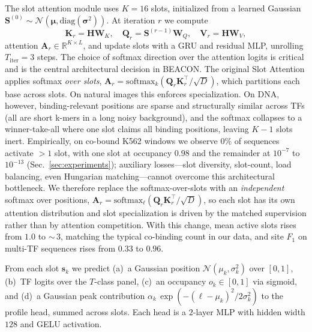 \documentclass{article}
\begin{document}
The slot attention module uses $K{=}16$ slots, initialized from a learned Gaussian $\mathbf{S}^{(0)}\!\sim\!\mathcal{N}(\boldsymbol{\mu},\mathrm{diag}(\boldsymbol{\sigma}^2))$. At iteration $r$ we compute
\begin{equation}
\mathbf{K}_r{=}\mathbf{H}\mathbf{W}_K,\quad \mathbf{Q}_r{=}\mathbf{S}^{(r-1)}\mathbf{W}_Q,\quad \mathbf{V}_r{=}\mathbf{H}\mathbf{W}_V,
\end{equation}
attention $\mathbf{A}_r\!\in\!\mathbb{R}^{K\times L}$, and update slots with a GRU and residual MLP, unrolling $T_{\text{iter}}{=}3$ steps. The choice of softmax direction over the attention logits is critical and is the central architectural decision in BEACON. The original Slot Attention applies softmax \emph{over slots}, $\mathbf{A}_r=\mathrm{softmax}_{k}(\mathbf{Q}_r\mathbf{K}_r^\top/\sqrt{D})$, which partitions each base across slots. On natural images this enforces specialization. On DNA, however, binding-relevant positions are sparse and structurally similar across TFs (all are short k-mers in a long noisy background), and the softmax collapses to a winner-take-all where one slot claims all binding positions, leaving $K{-}1$ slots inert. Empirically, on co-bound K562 windows we observe $0\%$ of sequences activate $>1$ slot, with one slot at occupancy $0.98$ and the remainder at $10^{-7}$ to $10^{-13}$ (Sec.~\ref{sec:experiments}); auxiliary losses---slot diversity, slot-count, load balancing, even Hungarian matching---cannot overcome this architectural bottleneck. We therefore replace the softmax-over-slots with an \emph{independent} softmax over positions, $\mathbf{A}_r=\mathrm{softmax}_{\ell}(\mathbf{Q}_r\mathbf{K}_r^\top/\sqrt{D})$, so each slot has its own attention distribution and slot specialization is driven by the matched supervision rather than by attention competition. With this change, mean active slots rises from $1.0$ to $\sim$\,$3$, matching the typical co-binding count in our data, and site $F_1$ on multi-TF sequences rises from $0.33$ to $0.96$.

From each slot $\mathbf{s}_k$ we predict (a)~a Gaussian position $\mathcal{N}(\mu_k,\sigma_k^2)$ over $[0,1]$, (b)~TF logits over the $T$-class panel, (c)~an occupancy $o_k\!\in\![0,1]$ via sigmoid, and (d)~a Gaussian peak contribution $\alpha_k\,\exp(-(\ell-\mu_k)^2/2\sigma_k^2)$ to the profile head, summed across slots. Each head is a $2$-layer MLP with hidden width $128$ and GELU activation.
\end{document}
